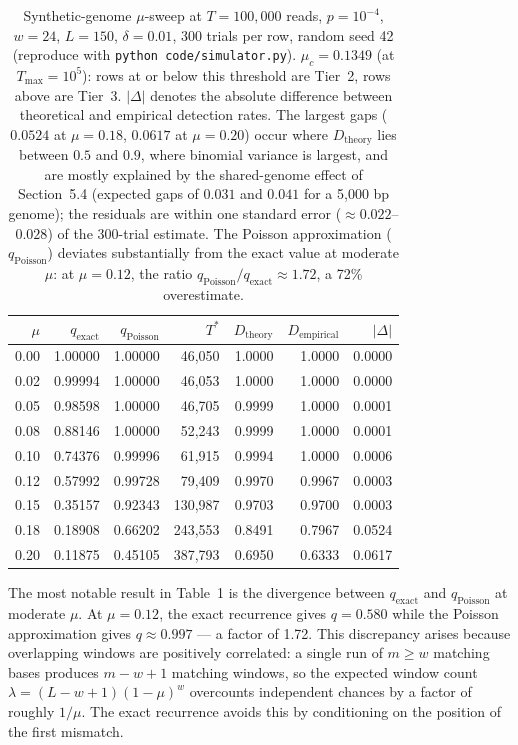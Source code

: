 \documentclass[12pt]{article}
\theoremstyle{definition}
\theoremstyle{plain}
\begin{document}
\begin{table}[!ht]
\centering
\small
\begin{tabular}{rrrrrrr}
\toprule
$\mu$ & $q_{\mathrm{exact}}$ & $q_{\mathrm{Poisson}}$ & $T^{*}$ & $D_{\mathrm{theory}}$ & $D_{\mathrm{empirical}}$ & $|\Delta|$ \\
\midrule
0.00 & 1.00000 & 1.00000 &  46,050 & 1.0000 & 1.0000 & 0.0000 \\
0.02 & 0.99994 & 1.00000 &  46,053 & 1.0000 & 1.0000 & 0.0000 \\
0.05 & 0.98598 & 1.00000 &  46,705 & 0.9999 & 1.0000 & 0.0001 \\
0.08 & 0.88146 & 1.00000 &  52,243 & 0.9999 & 1.0000 & 0.0001 \\
0.10 & 0.74376 & 0.99996 &  61,915 & 0.9994 & 1.0000 & 0.0006 \\
0.12 & 0.57992 & 0.99728 &  79,409 & 0.9970 & 0.9967 & 0.0003 \\
0.15 & 0.35157 & 0.92343 & 130,987 & 0.9703 & 0.9700 & 0.0003 \\
0.18 & 0.18908 & 0.66202 & 243,553 & 0.8491 & 0.7967 & 0.0524 \\
0.20 & 0.11875 & 0.45105 & 387,793 & 0.6950 & 0.6333 & 0.0617 \\
\bottomrule
\end{tabular}
\caption{Synthetic-genome $\mu$-sweep at $T=100{,}000$ reads, $p=10^{-4}$,
$w=24$, $L=150$, $\delta=0.01$, 300 trials per row, random seed 42
(reproduce with \texttt{python code/simulator.py}). $\mu_c=0.1349$ (at
$T_{\max}=10^5$): rows at or below this threshold are Tier~2, rows above are
Tier~3. $|\Delta|$ denotes the absolute difference between theoretical and
empirical detection rates. The largest gaps ($0.0524$ at $\mu=0.18$,
$0.0617$ at $\mu=0.20$) occur where $D_{\mathrm{theory}}$ lies between $0.5$ and
$0.9$, where binomial variance is largest, and are mostly explained by the
shared-genome effect of Section~5.4 (expected gaps of $0.031$ and $0.041$ for
a 5,000 bp genome); the residuals are within one standard error
($\approx0.022$--$0.028$) of the 300-trial estimate. The Poisson
approximation ($q_{\mathrm{Poisson}}$) deviates substantially from the exact
value at moderate $\mu$: at $\mu=0.12$, the ratio
$q_{\mathrm{Poisson}}/q_{\mathrm{exact}}\approx1.72$, a 72\% overestimate.}
\end{table}

The most notable result in Table~1 is the divergence between
$q_{\mathrm{exact}}$ and $q_{\mathrm{Poisson}}$ at moderate $\mu$. At
$\mu=0.12$, the exact recurrence gives $q=0.580$ while the Poisson
approximation gives $q\approx0.997$ --- a factor of 1.72. This discrepancy
arises because overlapping windows are positively correlated: a single run
of $m\ge w$ matching bases produces $m-w+1$ matching windows, so the
expected window count $\lambda=(L-w+1)(1-\mu)^{w}$ overcounts independent
chances by a factor of roughly $1/\mu$. The exact recurrence avoids this by
conditioning on the position of the first mismatch.
\end{document}
